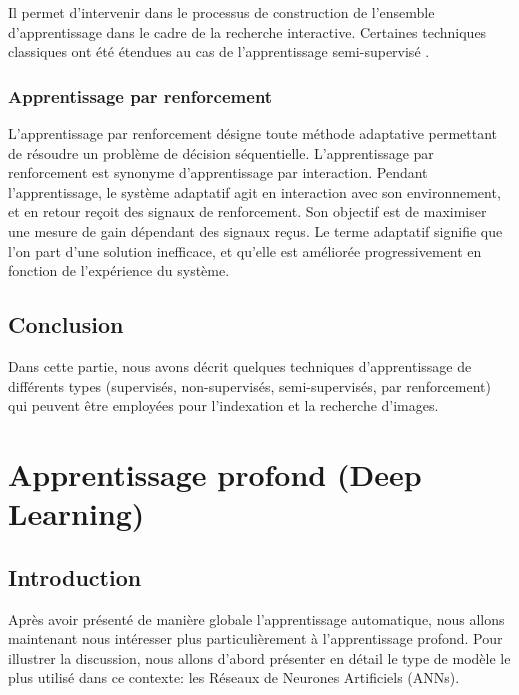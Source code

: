\documentclass[12pt]{article}
\begin{document}
Il permet d'intervenir dans le processus de construction de l'ensemble d'apprentissage dans le cadre de la recherche interactive. Certaines techniques classiques ont été étendues au cas de l'apprentissage semi-supervisé \cite{8}.
\subsubsection{Apprentissage par renforcement}
L’apprentissage par renforcement désigne toute méthode adaptative permettant de résoudre un problème de décision séquentielle. L'apprentissage par renforcement est synonyme d'apprentissage par interaction. Pendant l'apprentissage, le système adaptatif agit en interaction avec son environnement, et en retour reçoit des signaux de renforcement. Son objectif est de maximiser une mesure de gain dépendant des signaux reçus. Le terme adaptatif signifie que l'on part d'une solution inefficace, et qu'elle est améliorée progressivement en fonction de l'expérience du système.
\subsection{Conclusion}
Dans cette partie, nous avons décrit quelques techniques d'apprentissage de différents types (supervisés, non-supervisés, semi-supervisés, par renforcement) qui peuvent être employées pour l'indexation et la recherche d'images.

\newpage
\section{Apprentissage profond (Deep Learning)}
\subsection{Introduction}
Après avoir présenté de manière globale l’apprentissage automatique, nous allons maintenant nous intéresser plus particulièrement à l’apprentissage profond. Pour illustrer la discussion, nous allons d’abord présenter en détail le type de modèle le plus utilisé dans ce contexte: les Réseaux de Neurones Artificiels (ANNs).
\end{document}
